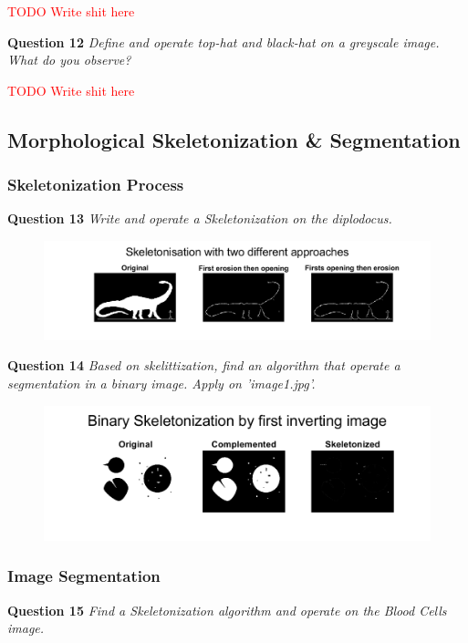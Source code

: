 \textcolor{red}{TODO Write shit here}


\textbf{Question 12} \textit{Deﬁne and operate top-hat and black-hat on a greyscale image. What do you observe?}

\textcolor{red}{TODO Write shit here}


\subsection{Morphological Skeletonization \& Segmentation}
\subsubsection{Skeletonization Process}
\textbf{Question 13} \textit{Write and operate a Skeletonization on the diplodocus.}

\begin{figure}[H]
    \centering
    \includegraphics[width=\linewidth]{Doc/Graphics/Part2/part2_Q13.png}
\end{figure}


\textbf{Question 14} \textit{Based on skelittization, ﬁnd an algorithm that operate a segmentation in a binary image. Apply on ’image1.jpg’.}

\begin{figure}[H]
    \centering
    \includegraphics[width=\linewidth]{Doc/Graphics/Part2/part2_Q14.png}
\end{figure}



\newpage
\subsubsection{Image Segmentation}
\textbf{Question 15} \textit{Find a Skeletonization algorithm and operate on the Blood Cells image.}

